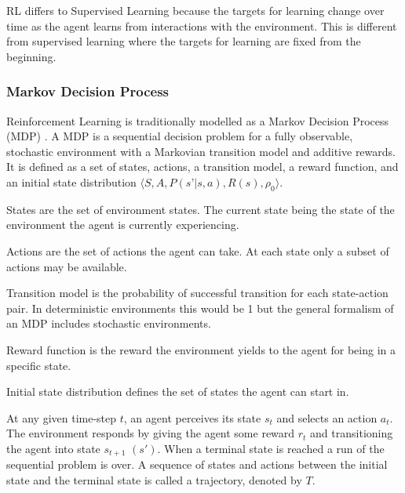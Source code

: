 \documentclass[10pt,journal,compsoc]{IEEEtran}
\begin{document}
RL differs to Supervised Learning \cite{LeCun:DeepLearning} because the targets for learning change over time as the agent learns from interactions with the environment. This is different from supervised learning where the targets for learning are fixed from the beginning.

\subsubsection{Markov Decision Process}
Reinforcement Learning is traditionally modelled as a Markov Decision Process (MDP) \cite{BOOK:AI}. A MDP is a sequential decision problem for a fully observable, stochastic environment with a Markovian transition model and additive rewards. It is defined as a set of states, actions, a transition model, a reward function, and an initial state distribution \begin{math}\langle S,A,P(s’|s,a),R(s),\rho_0 \rangle\end{math}. 

\begin{description}
\item[$S$] States are the set of environment states. The current state being the state of the environment the agent is currently experiencing.
\item[$A$] Actions are the set of actions the agent can take. At each state only a subset of actions may be available.
\item[$P(s'|s,a)$] Transition model is the probability of successful transition for each state-action pair. In deterministic environments this would be 1 but the general formalism of an MDP includes stochastic environments.
\item[$R(s)$] Reward function is the reward the environment yields to the agent for being in a specific state.
\item[$\rho_0$] Initial state distribution defines the set of states the agent can start in.
\end{description}


At any given time-step  \begin{math}t\end{math}, an agent perceives its state  \begin{math}s_t\end{math} and selects an action \begin{math}a_t\end{math}. The environment responds by giving the agent some reward  \begin{math}r_t\end{math} and transitioning the agent into state  \begin{math}s_{t+1}\end{math} \begin{math}(s')\end{math}. When a terminal state is reached a run of the sequential problem is over. A sequence of states and actions between the initial state and the terminal state is called a trajectory, denoted by  \begin{math}T\end{math}.
\end{document}
